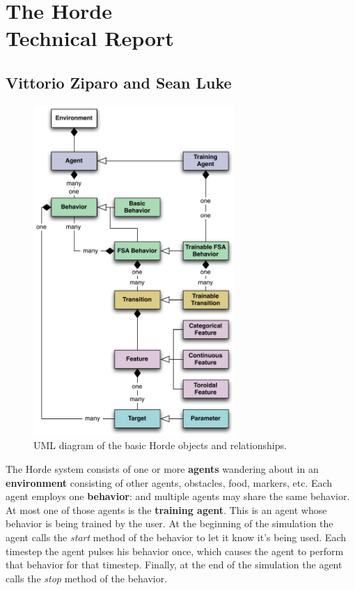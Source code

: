 \documentclass[11pt]{article}
\begin{document}
\section*{The Horde \\{\large Technical Report}}

\subsection*{Vittorio Ziparo and Sean Luke}

\begin{figure}
\vspace{-2em}
\begin{center}
\includegraphics[width=3in]{UML.pdf}
\end{center}
\vspace{-2em}
\caption{UML diagram of the basic Horde objects and relationships.}
\vspace{-2em}
\label{uml}
\end{figure}

The Horde system consists of one or more {\bf agents} wandering about in an {\bf environment} consisting of other agents, obstacles, food, markers, etc.  Each agent employs one {\bf behavior}: and multiple agents may share the same behavior.  At most one of those agents is the {\bf training agent}.  This is an agent whose behavior is being trained by the user.  At the beginning of the simulation the agent calls the {\it start} method of the behavior to let it know it's being used.  Each timestep the agent pulses his behavior once, which causes the agent to perform that behavior for that timestep.  Finally, at the end of the simulation the agent calls the {\it stop} method of the behavior.
\end{document}
